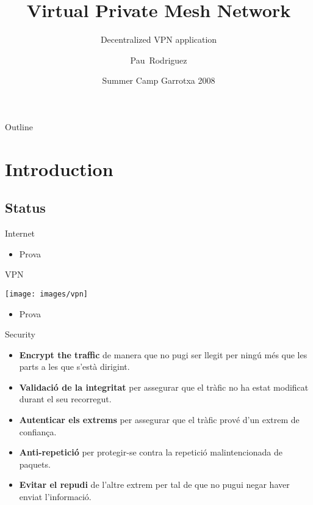 \documentclass{beamer}
\title[VPMN]{Virtual Private Mesh Network} %
\subtitle{Decentralized VPN application} %
\author[Pau]{Pau~Rodriguez} %
\institute[EPSC UPC] %
{
  Escola Polit\`ecnica Superior de Castelldefels\\
  Universitat Polit\`ecnica de Catalunya
}
\date[SCG08] %
{Summer Camp Garrotxa 2008}
\begin{document}
\begin{frame}
  \titlepage
\end{frame}

\begin{frame}{Outline}
  \tableofcontents
\end{frame}



\section{Introduction}
\subsection*{Status}
\begin{frame}{Internet}
	\begin{itemize}
	\item Prova
	\end{itemize}
\end{frame}
\begin{frame}{VPN}
	\begin{center}
	\texttt{[image: images/vpn]}
	\end{center}
	\begin{itemize}
	\item Prova
	\end{itemize}
\end{frame}
\begin{frame}{Security}
	\begin{itemize}
	\item \textbf{Encrypt the traffic} de manera que no pugi ser llegit per ningú més que les parts a les que s'està dirigint.
	\item \textbf{Validació de la integritat} per assegurar que el tràfic no ha estat modificat durant el seu recorregut.
	\item \textbf{Autenticar els extrems} per assegurar que el tràfic prové d'un extrem de confiança.
	\item \textbf{Anti-repetició} per protegir-se contra la repetició malintencionada de paquets.
	\item \textbf{Evitar el repudi} de l'altre extrem per tal de que no pugui negar haver enviat l'informació.
	\end{itemize}
\end{frame}
\end{document}
